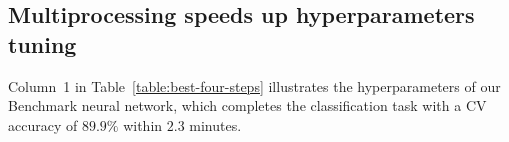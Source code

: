 \subsection{Multiprocessing speeds up hyperparameters tuning}
Column~1 in Table~\ref{table:best-four-steps} illustrates the hyperparameters of our Benchmark neural network, which completes the classification task with a CV accuracy of $89.9\%$ within $2.3$ minutes.


